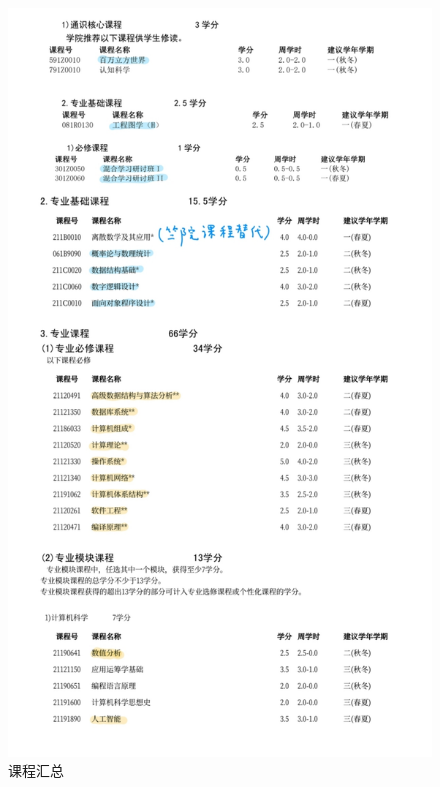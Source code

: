 \documentclass{article}
\begin{document}
    \begin{figure}[H]
    \centering
    \includegraphics[width=1\textwidth]{2.jpg}
    \caption{\label{总结}课程汇总}
    \end{figure}
\end{document}
